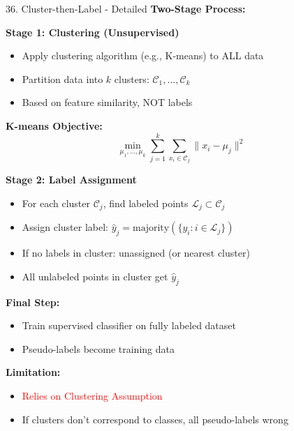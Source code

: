 \documentclass[8pt]{beamer}
\begin{document}
	\begin{frame}{36. Cluster-then-Label - Detailed}
		\fontsize{6.5}{7.5}\selectfont
		\textbf{Two-Stage Process:}
		
		\textbf{Stage 1: Clustering (Unsupervised)}
		\begin{itemize}
			\item Apply clustering algorithm (e.g., K-means) to ALL data
			\item Partition data into $k$ clusters: $\mathcal{C}_1, ..., \mathcal{C}_k$
			\item Based on feature similarity, NOT labels
		\end{itemize}
		
		\textbf{K-means Objective:}
		\[
		\min_{\mu_1,...,\mu_k} \sum_{j=1}^k \sum_{x_i \in \mathcal{C}_j} \|x_i - \mu_j\|^2
		\]
		
		\textbf{Stage 2: Label Assignment}
		\begin{itemize}
			\item For each cluster $\mathcal{C}_j$, find labeled points $\mathcal{L}_j \subset \mathcal{C}_j$
			\item Assign cluster label: $\hat{y}_j = \text{majority}(\{y_i : i \in \mathcal{L}_j\})$
			\item If no labels in cluster: unassigned (or nearest cluster)
			\item All unlabeled points in cluster get $\hat{y}_j$
		\end{itemize}
		
		\textbf{Final Step:}
		\begin{itemize}
			\item Train supervised classifier on fully labeled dataset
			\item Pseudo-labels become training data
		\end{itemize}
		
		\textbf{Limitation:}
		\begin{itemize}
			\item \textcolor{red}{Relies on Clustering Assumption}
			\item If clusters don't correspond to classes, all pseudo-labels wrong
		\end{itemize}
	\end{frame}
	
\end{document}
